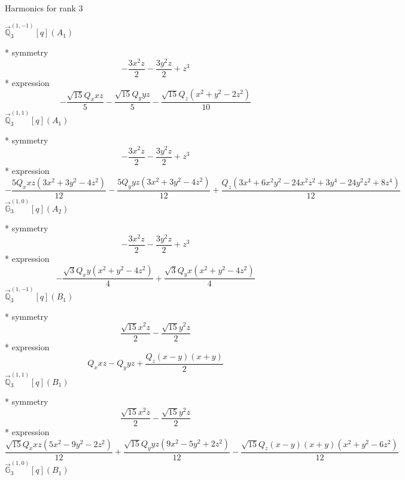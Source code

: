 \documentclass[fleqn,8pt]{jsarticle}
\begin{document}
\noindent * Harmonics for rank 3

\noindent\quad $\vec{\mathbb{Q}}_{3}^{(1,-1)}[q](A_{1})$

\noindent\quad ** symmetry
\begin{dmath*}
- \frac{3 x^{2} z}{2} - \frac{3 y^{2} z}{2} + z^{3}
\end{dmath*}
\noindent\quad ** expression
\begin{dmath*}
- \frac{\sqrt{15} Q_{x} x z}{5} - \frac{\sqrt{15} Q_{y} y z}{5} - \frac{\sqrt{15} Q_{z} \left(x^{2} + y^{2} - 2 z^{2}\right)}{10}
\end{dmath*}
\noindent\quad $\vec{\mathbb{Q}}_{3}^{(1,1)}[q](A_{1})$

\noindent\quad ** symmetry
\begin{dmath*}
- \frac{3 x^{2} z}{2} - \frac{3 y^{2} z}{2} + z^{3}
\end{dmath*}
\noindent\quad ** expression
\begin{dmath*}
- \frac{5 Q_{x} x z \left(3 x^{2} + 3 y^{2} - 4 z^{2}\right)}{12} - \frac{5 Q_{y} y z \left(3 x^{2} + 3 y^{2} - 4 z^{2}\right)}{12} + \frac{Q_{z} \left(3 x^{4} + 6 x^{2} y^{2} - 24 x^{2} z^{2} + 3 y^{4} - 24 y^{2} z^{2} + 8 z^{4}\right)}{12}
\end{dmath*}
\noindent\quad $\vec{\mathbb{G}}_{3}^{(1,0)}[q](A_{2})$

\noindent\quad ** symmetry
\begin{dmath*}
- \frac{3 x^{2} z}{2} - \frac{3 y^{2} z}{2} + z^{3}
\end{dmath*}
\noindent\quad ** expression
\begin{dmath*}
- \frac{\sqrt{3} Q_{x} y \left(x^{2} + y^{2} - 4 z^{2}\right)}{4} + \frac{\sqrt{3} Q_{y} x \left(x^{2} + y^{2} - 4 z^{2}\right)}{4}
\end{dmath*}
\noindent\quad $\vec{\mathbb{Q}}_{3}^{(1,-1)}[q](B_{1})$

\noindent\quad ** symmetry
\begin{dmath*}
\frac{\sqrt{15} x^{2} z}{2} - \frac{\sqrt{15} y^{2} z}{2}
\end{dmath*}
\noindent\quad ** expression
\begin{dmath*}
Q_{x} x z - Q_{y} y z + \frac{Q_{z} \left(x - y\right) \left(x + y\right)}{2}
\end{dmath*}
\noindent\quad $\vec{\mathbb{Q}}_{3}^{(1,1)}[q](B_{1})$

\noindent\quad ** symmetry
\begin{dmath*}
\frac{\sqrt{15} x^{2} z}{2} - \frac{\sqrt{15} y^{2} z}{2}
\end{dmath*}
\noindent\quad ** expression
\begin{dmath*}
\frac{\sqrt{15} Q_{x} x z \left(5 x^{2} - 9 y^{2} - 2 z^{2}\right)}{12} + \frac{\sqrt{15} Q_{y} y z \left(9 x^{2} - 5 y^{2} + 2 z^{2}\right)}{12} - \frac{\sqrt{15} Q_{z} \left(x - y\right) \left(x + y\right) \left(x^{2} + y^{2} - 6 z^{2}\right)}{12}
\end{dmath*}
\noindent\quad $\vec{\mathbb{G}}_{3}^{(1,0)}[q](B_{1})$
\end{document}
